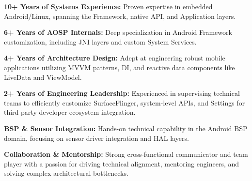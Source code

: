 \begin{cventries}

  \cvsingleentry
    {
      \begin{cvitems} %
	\item {\textbf{10+ Years of Systems Experience:} Proven expertise in embedded Android/Linux, spanning the Framework, native API, and Application layers.}
  	\item {\textbf{6+ Years of AOSP Internals:} Deep specialization in Android Framework customization, including JNI layers and custom System Services.}
  	\item {\textbf{4+ Years of Architecture Design:} Adept at engineering robust mobile applications utilizing MVVM patterns, DI, and reactive data components like LiveData and ViewModel.}
	\item {\textbf{2+ Years of Engineering Leadership:} Experienced in supervising technical teams to efficiently customize SurfaceFlinger, system-level APIs, and Settings for third-party developer ecosystem integration.}
  	\item {\textbf{BSP \& Sensor Integration:} Hands-on technical capability in the Android BSP domain, focusing on sensor driver integration and HAL layers.}
  	\item {\textbf{Collaboration \& Mentorship:} Strong cross-functional communicator and team player with a passion for driving technical alignment, mentoring engineers, and solving complex architectural bottlenecks.}
      \end{cvitems}
    }
 \end{cventries}
